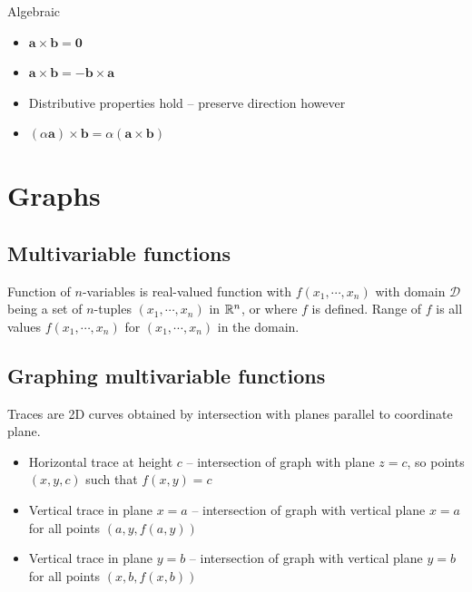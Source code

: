 Algebraic
\begin{itemize}
    \item $\textbf{a}\times \textbf{b}=\textbf{0}$
    \item $\textbf{a}\times \textbf{b}=-\textbf{b}\times \textbf{a}$
    \item Distributive properties hold -- preserve direction however
    \item $(\alpha \textbf{a})\times \textbf{b}=\alpha(\textbf{a}\times \textbf{b})$
\end{itemize}

\section{Graphs}

\subsection{Multivariable functions}

Function of $n$-variables is real-valued function with $f(x_1,\cdots,x_n)$ with domain $\mathcal{D}$
being a set of $n$-tuples $(x_1,\cdots,x_n)$ in $\mathbb{R}^n$, or where $f$ is defined.
Range of $f$ is all values $f(x_1,\cdots,x_n)$ for $(x_1,\cdots,x_n)$ in the domain.

\subsection{Graphing multivariable functions}

Traces are 2D curves obtained by intersection with planes parallel to coordinate plane.
\begin{itemize}
    \item Horizontal trace at height $c$ -- intersection of graph with plane $z=c$, so points $(x,y,c)$ such that $f(x,y)=c$
    \item Vertical trace in plane $x=a$ -- intersection of graph with vertical plane $x=a$ for all points $(a,y,f(a,y))$
    \item Vertical trace in plane $y=b$ -- intersection of graph with vertical plane $y=b$ for all points $(x,b,f(x,b))$
\end{itemize}

